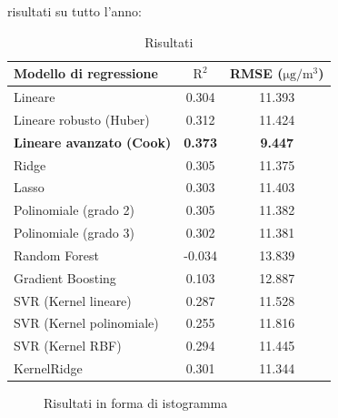 risultati su tutto l’anno:
\begin{table}[H]
    \footnotesize
    \centering
    \begin{tabular}{|l|c|c|}
    \hline
        \textbf{Modello di regressione} & $\bm{\mathrm{R^2}}$ & \textbf{RMSE (}$\mathrm{\si{\micro}g/m^3}$) \\ \hline
        Lineare & 0.304 & 11.393 \\ \hline
        Lineare robusto (Huber) & 0.312 & 11.424 \\ \hline
        \textbf{Lineare avanzato (Cook)} & \textbf{0.373} & \textbf{9.447} \\ \hline
        Ridge & 0.305 & 11.375 \\ \hline
        Lasso & 0.303 & 11.403 \\ \hline
        Polinomiale (grado 2) & 0.305 & 11.382 \\ \hline
        Polinomiale (grado 3) & 0.302 & 11.381 \\ \hline
        Random Forest & -0.034 & 13.839 \\ \hline
        Gradient Boosting & 0.103 & 12.887 \\ \hline
        SVR (Kernel lineare) & 0.287 & 11.528 \\ \hline
        SVR (Kernel polinomiale) & 0.255 & 11.816 \\ \hline
        SVR (Kernel RBF) & 0.294 & 11.445 \\ \hline
        KernelRidge & 0.301 & 11.344 \\ \hline
    \end{tabular}
    \caption{Risultati}
    \label{fig:risultati-no2}
\end{table}

\begin{figure}[H]%
    \centering
    \captionsetup{justification=centering}
    \caption{Risultati in forma di istogramma}%
    \label{fig:risultati-no2-hist}%
\end{figure}

